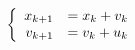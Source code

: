 \documentclass{article}
\begin{document}
\thispagestyle{empty}


$$
\left \{ \begin{array}{r l}
x_{k+1} & = x_k + v_k\\
v_{k+1} & = v_k + u_k
\end{array} \right.
$$
\end{document}
